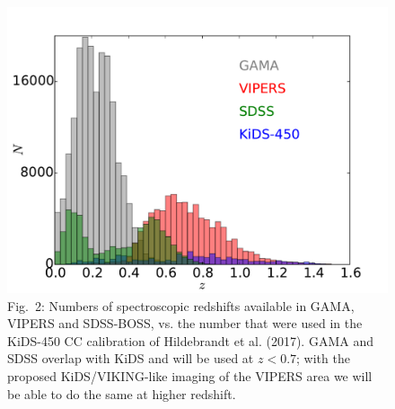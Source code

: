 \documentclass{article}[11pt]
\begin{document}
\begin{figure}
 \begin{minipage}[c]{0.6\textwidth}
  \includegraphics[width=\textwidth]{ESO_prop_plot_zdist.pdf}
  \end{minipage}\hfill
  \begin{minipage}[c]{0.35\textwidth}
    \caption*{Fig.~2: Numbers of spectroscopic redshifts available in GAMA, VIPERS and SDSS-BOSS, vs. the number that were used in the KiDS-450 CC calibration of Hildebrandt et al. (2017). GAMA and SDSS overlap with KiDS and will be used at $z<0.7$; with the proposed KiDS/VIKING-like imaging of the VIPERS area we will be able to do the same at higher redshift.}
  \end{minipage}
\end{figure}
\end{document}
